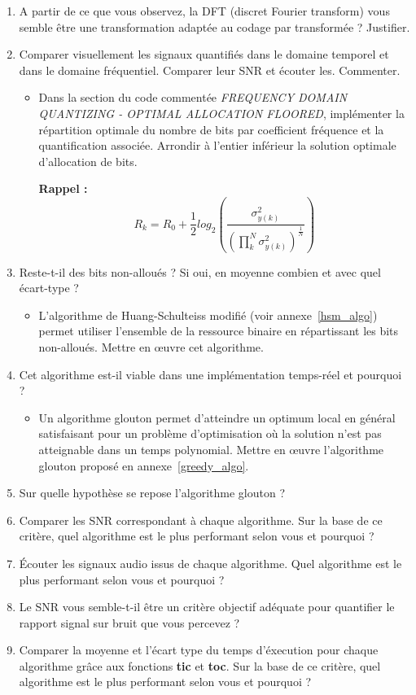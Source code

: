 \documentclass{article}
\begin{document}
\begin{enumerate}[label=\textbf{\arabic*})]
	\item A partir de ce que vous observez, la DFT (discret Fourier transform) vous semble être une transformation adaptée au codage par transformée ? Justifier.
	\item Comparer visuellement les signaux quantifiés dans le domaine temporel et dans le domaine fréquentiel. Comparer leur SNR et écouter les. Commenter.
	
	\begin{itemize}
		\item Dans la section du code commentée \emph{FREQUENCY DOMAIN QUANTIZING - OPTIMAL ALLOCATION FLOORED}, implémenter la répartition optimale du nombre de bits par coefficient fréquence et la quantification associée. Arrondir à l'entier inférieur la solution optimale d'allocation de bits.
		
		\textbf{Rappel :}
		$$
		R_k = R_0 + \frac{1}{2} log_2\left(\frac{\sigma_{y(k)}^2}{\left(\prod\limits_k^N \sigma_{y(k)}^2\right)^{\frac{1}{ N}}}\right)
		$$
	\end{itemize}

	\item Reste-t-il des bits non-alloués ? Si oui, en moyenne combien et avec quel écart-type ?
	
	\begin{itemize}
		\item L’algorithme de Huang-Schulteiss modifié (voir annexe~\ref{hsm_algo}) permet utiliser l’ensemble de la ressource binaire en répartissant les bits non-alloués. Mettre en \oe uvre cet algorithme.
	\end{itemize}
	\item Cet algorithme est-il viable dans une implémentation temps-réel et pourquoi ?
	\begin{itemize}
		\item Un algorithme glouton permet d'atteindre un optimum local en général satisfaisant pour un problème d'optimisation où la solution n'est pas atteignable dans un temps polynomial. Mettre en œuvre l’algorithme glouton proposé en annexe~\ref{greedy_algo}.
	\end{itemize}
	\item Sur quelle hypothèse se repose l'algorithme glouton ?
	\item Comparer les SNR correspondant à chaque algorithme. Sur la base de ce critère, quel algorithme est le plus performant selon vous et pourquoi ?
	\item Écouter les signaux audio issus de chaque algorithme. Quel algorithme est le plus performant selon vous et pourquoi ?
	\item Le SNR vous semble-t-il être un critère objectif adéquate pour quantifier le rapport signal sur bruit que vous percevez ?
	\item Comparer la moyenne et l'écart type du temps d'éxecution pour chaque algorithme grâce aux fonctions \textbf{tic} et \textbf{toc}. Sur la base de ce critère, quel algorithme est le plus performant selon vous et pourquoi ?
	
\end{enumerate}
\end{document}
